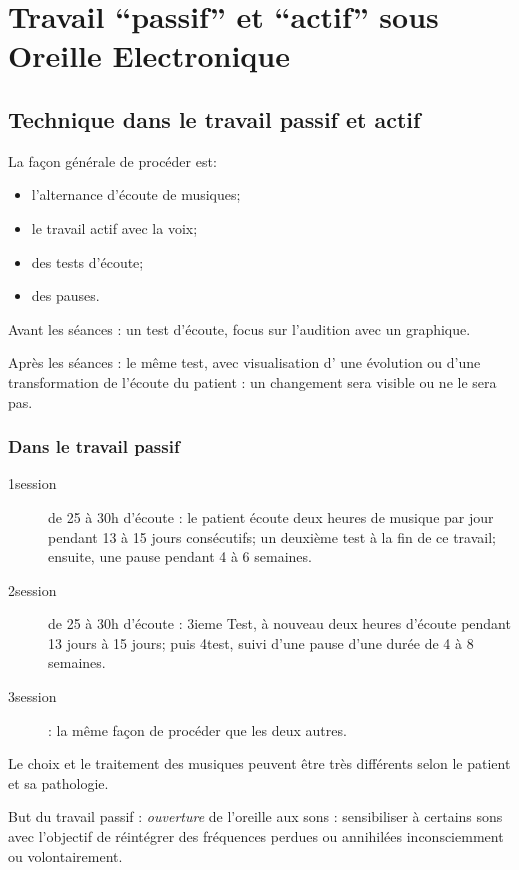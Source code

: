 \section{Travail ``passif'' et ``actif'' sous Oreille Electronique}

\subsection{Technique dans le travail passif et actif}

La façon générale de procéder est:
\begin{itemize}
\item  l'alternance d'écoute de musiques;
\item le travail actif avec la voix;
\item des tests d'écoute;
\item des pauses.
\end{itemize}

Avant les séances : un test d'écoute, focus sur l'audition avec un
graphique.

Après les séances : le même test, avec visualisation d' une évolution
ou d'une transformation de l'écoute du patient : un changement sera
visible ou ne le sera pas.

\subsubsection{Dans le travail passif}

\begin{description}
\item [{1\iere session}] de 25 à 30h d'écoute : le patient écoute
deux heures de musique par jour pendant 13 à 15 jours consécutifs;
un deuxième test à la fin de ce travail; ensuite, une pause pendant
4 à 6 semaines.
\item [{2\ieme session}] de 25 à 30h d'écoute : 3ieme Test, à nouveau
deux heures d'écoute pendant 13 jours à 15 jours; puis 4\ieme test,
suivi d'une pause d'une durée de 4 à 8 semaines.
\item [{3\ieme session}] : la même façon de procéder que les deux
autres. 
\end{description}
Le choix et le traitement des musiques peuvent être très différents
selon le patient et sa pathologie.

But du travail passif : \emph{ouverture} de l'oreille
aux sons : sensibiliser à certains sons avec l'objectif de réintégrer
des fréquences perdues ou annihilées inconsciemment ou volontairement. 

